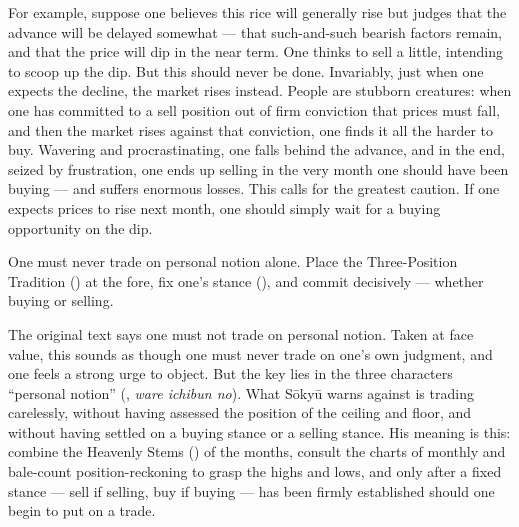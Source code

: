 


For example, suppose one believes this rice will generally rise but judges
that the advance will be delayed somewhat --- that such-and-such bearish
factors remain, and that the price will dip in the near term. One thinks
to sell a little, intending to scoop up the dip. But this should never be
done. Invariably, just when one expects the decline, the market rises
instead. People are stubborn creatures: when one has committed to a sell
position out of firm conviction that prices must fall, and then the market
rises against that conviction, one finds it all the harder to buy.
Wavering and procrastinating, one falls behind the advance, and in the
end, seized by frustration, one ends up selling in the very month one
should have been buying --- and suffers enormous losses. This calls for
the greatest caution. If one expects prices to rise next month, one
should simply wait for a buying opportunity on the dip.


\begin{sokyubox}
{\small\itshape\color{sokyubar} }

\medskip
One must never trade on personal notion alone. Place the Three-Position
Tradition () at the fore, fix one's stance
(), and commit decisively --- whether buying or selling.
\end{sokyubox}

\commentary
The original text says one must not trade on personal notion. Taken at
face value, this sounds as though one must never trade on one's own
judgment, and one feels a strong urge to object. But the key lies in the
three characters ``personal notion'' (, \textit{ware ichibun
no}). What S\=oky\=u warns against is trading carelessly, without having
assessed the position of the ceiling and floor, and without having
settled on a buying stance or a selling stance. His meaning is this:
combine the Heavenly Stems () of the months, consult
the charts of monthly and bale-count position-reckoning to grasp the
highs and lows, and only after a fixed stance --- sell if selling, buy if
buying --- has been firmly established should one begin to put on a trade.


